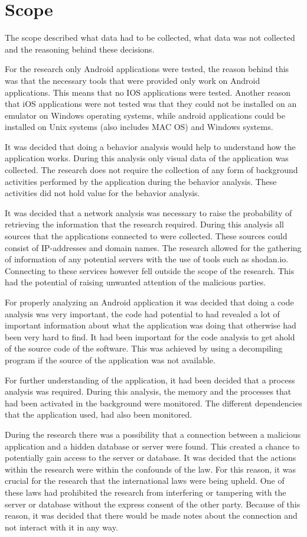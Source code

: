 \section{Scope}

The scope described what data had to be collected, what data was not collected and the reasoning behind these decisions.

For the research only Android applications were tested, the reason behind this was that the necessary tools that were provided only work on Android applications. This means that no IOS applications were tested. Another reason that iOS applications were not tested was that they could not be installed on an emulator on Windows operating systems, while android applications could be installed on Unix systems (also includes MAC OS) and Windows systems.

It was decided that doing a behavior analysis would help to understand how the application works. During this analysis only visual data of the application was collected. The research does not require the collection of any form of background activities performed by the application during the behavior analysis. These activities did not hold value for the behavior analysis.

It was decided that a network analysis was necessary to raise the probability of retrieving the information that the research required. During this analysis all sources that the applications connected to were collected. These sources could consist of IP-addresses and domain names. The research allowed for the gathering of information of any potential servers with the use of tools such as shodan.io. Connecting to these services however fell outside the scope of the research. This had the potential of raising unwanted attention of the malicious parties.

For properly analyzing an Android application it was decided that doing a code analysis was very important, the code had potential to had revealed a lot of important information about what the application was doing that otherwise had been very hard to find. It had been important for the code analysis to get ahold of the source code of the software. This was achieved by using a decompiling program if the source of the application was not available.

For further understanding of the application, it had been decided that a process analysis was required. During this analysis, the memory and the processes that had been activated in the background were monitored. The different dependencies that the application used, had also been monitored.

During the research there was a possibility that a connection between a malicious application and a hidden database or server were found. This created a chance to potentially gain access to the server or database. It was decided that the actions within the research were within the confounds of the law. For this reason, it was crucial for the research that the international laws were being upheld. One of these laws had prohibited the research from interfering or tampering with the server or database without the express consent of the other party. Because of this reason, it was decided that there would be made notes about the connection and not interact with it in any way.